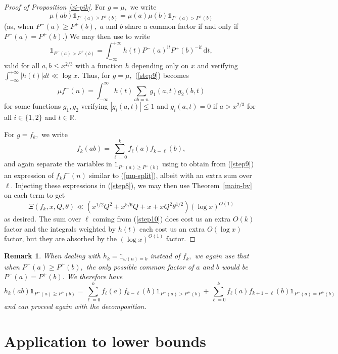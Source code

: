 \documentclass{article}
\newtheorem*{remark}{Remark}
\newcommand{\de}{\,\mathrm{d}}
\newcommand{\ii}{\mathrm{i}}
\newcommand{\R}{\mathds{R}}
\newcommand{\Ind}{\mathbb{1}}
\begin{document}
\begin{proof}[Proof of Proposition \ref{xi-pik}]
    For $g = \mu,$ we write $$\mu(ab) \Ind_{P^-(a) \ge P^+(b)} = \mu(a) \mu(b) \Ind_{P^-(a) > P^+(b)}$$ (as, when $P^-(a) \ge P^+(b),$ $a$ and $b$ share a common factor if and only if $P^-(a) = P^+(b).$) We may then use \cite[Lemma 13.11]{ik} to write $$\Ind_{P^-(a) > P^+(b)} = \int_{-\infty}^{+\infty} h(t) P^{-}(a)^{\ii t} P^+(b)^{-\ii t} \de t,$$ valid for all $a,b\le x^{2/3}$ with a function $h$ depending only on $x$ and verifying $\int_{-\infty}^{+\infty} |h(t)| dt \ll \log x.$ Thus, for $g = \mu,$ (\ref{step9}) becomes 
    \begin{equation}\label{mu-split}
        \mu f^-(n) = \int_{-\infty}^{\infty} h(t) \sum_{ab = n} g_1(a,t) g_2(b,t) 
    \end{equation}
    for some functions $g_1, g_2$ verifying $|g_i(a,t)| \le 1$ and $g_i(a,t) = 0$ if $a> x^{2/3}$ for all $i\in\{1,2\}$ and $t\in \R.$

    For $g = f_k,$ we write \begin{equation}\label{step10}
        f_k(ab) = \sum_{\ell = 0}^k f_\ell (a) f_{k-\ell}(b),
    \end{equation}
    and again separate the variables in $\Ind_{P^-(a) \ge P^+(b)}$ using \cite[Lemma 13.11]{ik} to obtain from (\ref{step9}) an expression of $f_k f^-(n)$ similar to (\ref{mu-split}), albeit with an extra sum over $\ell.$ Injecting these expressions in (\ref{step8}), we may then %
    use Theorem~\ref{main-bv} on each term to get $$\Xi(f_k, x, Q,\theta) \ll \left(x^{1/2}Q^2 + x^{5/6}Q + x + xQ^2\theta^{1/2}\right)(\log x)^{O(1)}$$ as desired. The sum over $\ell$ coming from (\ref{step10}) does cost us an extra $O(k)$ factor and the integrals weighted by $h(t)$ each cost us an extra $O(\log x)$ factor, but they are absorbed by the $(\log x)^{O(1)}$ factor.
\end{proof}
\begin{remark}
    When dealing with $h_k = \Ind_{\omega(n) = k}$ instead of $f_k,$ we again use that when $P^-(a) \ge P^+(b),$ the only possible common factor of $a$ and $b$ would be $P^-(a) = P^+(b).$ We therefore have 
    $$h_k(ab) \Ind_{P^-(a) \ge P^+(b)} = \sum_{\ell = 0}^k f_\ell (a) f_{k-\ell}(b) \Ind_{P^-(a) > P^+(b)} + \sum_{\ell = 0}^k f_\ell (a) f_{k+1-\ell}(b) \Ind_{P^-(a) = P^+(b)}$$ and can proceed again with the decomposition.
\end{remark}


\section{Application to lower bounds}\label{end}
\end{document}
